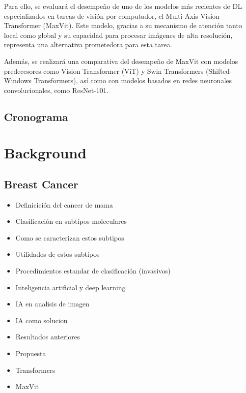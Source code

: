\documentclass[a4paper,10pt]{book}
\begin{document}
Para ello, se evaluará el desempeño de uno de los modelos más recientes de DL especializados en tareas de visión por computador, el Multi-Axis Vision Transformer (MaxVit). Este modelo, gracias a su mecanismo de atención tanto local como global y su capacidad para procesar imágenes de alta resolución, representa una alternativa prometedora para esta tarea.

Además, se realizará una comparativa del desempeño de MaxVit con modelos predecesores como Vision Transformer (ViT) y Swin Transformers (Shifted-Windows Transformers), así como con modelos basados en redes neuronales convolucionales, como ResNet-101.



\section{Cronograma}


\chapter{Background}

\section{Breast Cancer}


\begin{itemize}
  \item Definicición del cancer de mama
    \item Clasificación en subtipos moleculares
    \item Como se caracterizan estos subtipos
     \item Utilidades de estos subtipos
      \item Procedimientos estandar de clasificación (invasivos)
       \item Inteligencia artificial y deep learning
        \item IA en analisis de imagen
         \item IA como solucion
          \item Resultados anteriores
           \item Propuesta
            \item Transformers
             \item MaxVit
\end{itemize}


\backmatter
{}


\end{document}
